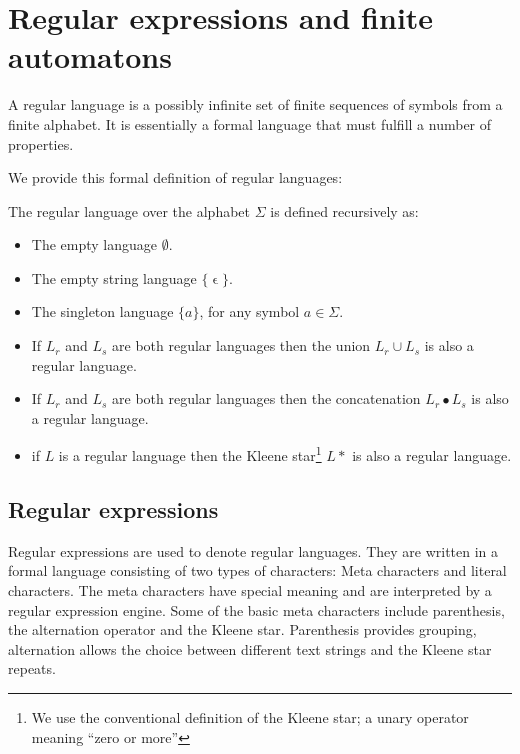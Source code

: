 \section{Regular expressions and finite automatons}


A regular language is a possibly infinite set of finite sequences of
symbols from a finite alphabet.  It is essentially a formal language that must fulfill a number
of properties. 

We provide this formal definition of regular languages:
\begin{definition}
  The regular language over the alphabet $\Sigma$ is defined
  recursively as:
  \begin{itemize}
  \item The empty language $\emptyset$.
  \item The empty string language $\{\upvarepsilon\}$.
  \item The singleton language $\{a\}$, for any symbol $a\in \Sigma$.
  \item If $L_r$ and $L_s$ are both regular languages then the union
    $L_r \cup L_s$ is also a regular language.
  \item If $L_r$ and $L_s$ are both regular languages then the
    concatenation $L_r \bullet L_s$ is also a regular language.
  \item if $L$ is a regular language then the Kleene star\footnote{We use the conventional definition of the Kleene star; a unary operator meaning ``zero or more'' } $L*$ is also
    a regular language.
  \end{itemize}
\end{definition}



\subsection{Regular expressions}

Regular expressions are used to denote regular languages. They are
written in a formal language consisting of two types of characters:
Meta characters and literal characters. The meta characters have
special meaning and are interpreted by a regular expression
engine. Some of the basic meta characters include parenthesis, the alternation
operator and the Kleene star. Parenthesis provides grouping,
alternation allows the choice between different text strings and the
Kleene star repeats. 

